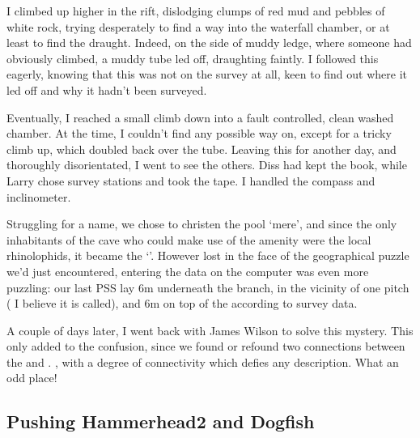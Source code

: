 	
	I climbed up higher in the rift, dislodging clumps of red mud and pebbles of white rock, trying desperately to find a way into the waterfall chamber, or at least to find the draught. Indeed, on the side of muddy ledge, where someone had obviously climbed, a muddy tube led off, draughting faintly. I followed this eagerly, knowing that this was not on the survey at all, keen to find out where it led off and why it hadn't been surveyed. 

	Eventually, I reached a small climb down into a fault controlled, clean washed chamber. At the time, I couldn't find any possible way on, except for a tricky climb up, which doubled back over the tube. Leaving this for another day, and thoroughly disorientated, I went to see the others. Diss had kept the book, while Larry chose survey stations and took the tape. I handled the compass and inclinometer. 
	
	Struggling for a name, we chose to christen the pool `mere', and since the only inhabitants of the cave who could make use of the amenity were the local rhinolophids, it became the `'. However lost in the face of the geographical puzzle we'd just encountered, entering the data on the computer was even more puzzling: our last PSS lay 6m underneath the  branch, in the vicinity of one pitch ( I believe it is called), and 6m on top of the  according to survey data.
	
	A couple of days later, I went back with James Wilson to solve this mystery. This only added to the confusion, since we found or refound two connections between the  and . , with a degree of connectivity which defies any description. What an odd place!


\subsection{Pushing Hammerhead2 and Dogfish}

\begin{marginfigure}
\end{marginfigure}

